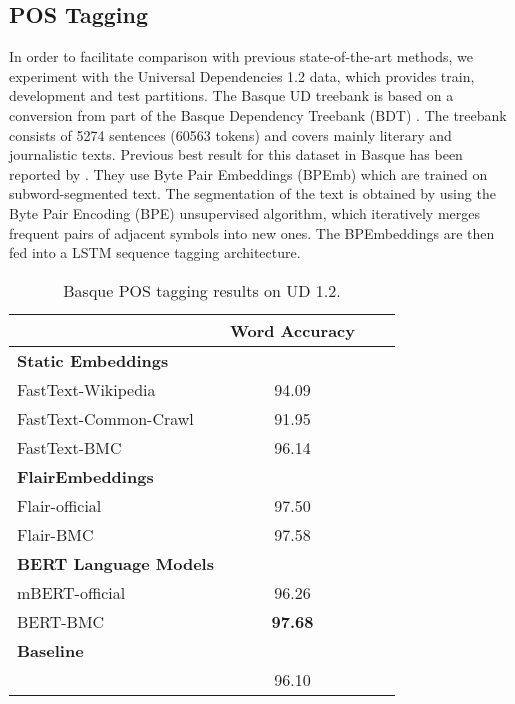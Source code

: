 \documentclass[10pt, a4paper]{article}
\begin{document}
\subsection{POS Tagging}\label{sec:pos-tagging}

In order to facilitate comparison with previous state-of-the-art methods, we experiment with the Universal Dependencies 1.2 data, which provides train, development and test partitions. The Basque UD treebank \cite{aranzabe2015automatic} is based on a conversion from part of the Basque Dependency Treebank (BDT) \cite{aduriz2003construction}. The treebank consists of 5274 sentences (60563 tokens) and covers mainly literary and journalistic texts. Previous best result for this dataset in Basque has been reported by \cite{heinzerling-strube-2019-sequence}. They use Byte Pair Embeddings (BPEmb) which are trained on subword-segmented text. The segmentation of the text is obtained by using the Byte Pair Encoding (BPE) unsupervised algorithm, which iteratively merges frequent pairs of adjacent symbols into new ones. The BPEmbeddings are then fed into a LSTM sequence tagging architecture.


\begin{table}[!ht]\footnotesize
\centering
\begin{tabular}{@{\hspace{0.3cm}}lccc} \hline
 \textbf{} & \textbf{Word Accuracy} \\ \hline
\textbf{Static Embeddings} & \\
FastText-Wikipedia & 94.09 \\
FastText-Common-Crawl & 91.95 \\
FastText-BMC  & 96.14 \\ \hline
\textbf{FlairEmbeddings} \\
Flair-official & 97.50 \\
Flair-BMC  &  97.58 \\ \hline
\textbf{BERT Language Models}\\
mBERT-official &  96.26 \\
BERT-BMC & \textbf{97.68} \\ \hline
\textbf{Baseline} \\
\cite{heinzerling-strube-2019-sequence} & 96.10 \\ \hline
\end{tabular}
\caption{Basque POS tagging results on UD 1.2.}\label{tab:pos}
\end{table}
\end{document}

